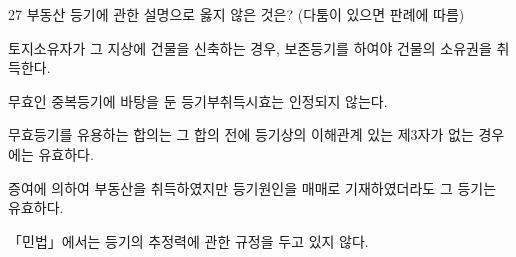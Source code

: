 \begin{question}{27}
부동산 등기에 관한 설명으로 옳지 않은 것은? (다툼이 있으면 판례에 따름)
\begin{choices}
  \item 토지소유자가 그 지상에 건물을 신축하는 경우, 보존등기를 하여야 건물의 소유권을 취득한다.
  \item 무효인 중복등기에 바탕을 둔 등기부취득시효는 인정되지 않는다.
  \item 무효등기를 유용하는 합의는 그 합의 전에 등기상의 이해관계 있는 제3자가 없는 경우에는 유효하다.
  \item 증여에 의하여 부동산을 취득하였지만 등기원인을 매매로 기재하였더라도 그 등기는 유효하다.
  \item 「민법」에서는 등기의 추정력에 관한 규정을 두고 있지 않다.
\end{choices}
\end{question}
